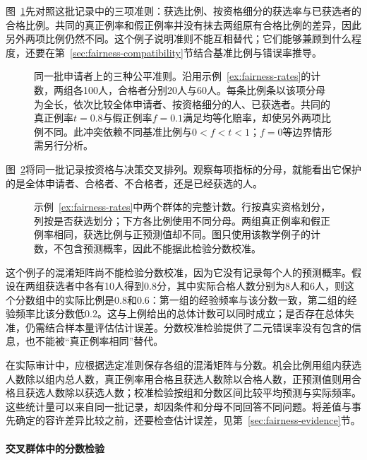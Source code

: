 图~\ref{fig:trust-fairness-incompatibility}先对照这批记录中的三项准则：获选比例、按资格细分的获选率与已获选者的合格比例。共同的真正例率和假正例率并没有抹去两组原有合格比例的差异，因此另外两项比例仍然不同。这个例子说明准则不能互相替代；它们能够兼顾到什么程度，还要在第~\ref{sec:fairness-compatibility}节结合基准比例与错误率推导。

\begin{figure}[htbp]
  \centering
  
  \caption{同一批申请者上的三种公平准则。沿用示例~\ref{ex:fairness-rates}的计数，两组各100人，合格者分别20人与60人。每条比例条以该项分母为全长，依次比较全体申请者、按资格细分的人、已获选者。共同的真正例率$t=0.8$与假正例率$f=0.1$满足均等化赔率，却使另外两项比例不同。此冲突依赖不同基准比例与$0<f<t<1$；$f=0$等边界情形需另行分析。}
  \label{fig:trust-fairness-incompatibility}
\end{figure}

图~\ref{fig:trust-fairness-denominators}将同一批记录按资格与决策交叉排列。观察每项指标的分母，就能看出它保护的是全体申请者、合格者、不合格者，还是已经获选的人。

\begin{figure}[!htb]
  \centering
  
  \caption{示例~\ref{ex:fairness-rates}中两个群体的完整计数。行按真实资格划分，列按是否获选划分；下方各比例使用不同分母。两组真正例率和假正例率相同，获选比例与正预测值却不同。图只使用该教学例子的计数，不包含预测概率，因此不能据此检验分数校准。}
  \label{fig:trust-fairness-denominators}
\end{figure}

这个例子的混淆矩阵尚不能检验分数校准，因为它没有记录每个人的预测概率。假设在两组获选者中各有10人得到$0.8$分，其中实际合格人数分别为8人和6人，则这个分数组中的实际比例是$0.8$和$0.6$：第一组的经验频率与该分数一致，第二组的经验频率比该分数低$0.2$。这与上例给出的总体计数可以同时成立；是否存在总体失准，仍需结合样本量评估估计误差。分数校准检验提供了二元错误率没有包含的信息，也不能被“真正例率相同”替代。

在实际审计中，应根据选定准则保存各组的混淆矩阵与分数。机会比例用组内获选人数除以组内总人数，真正例率用合格且获选人数除以合格人数，正预测值则用合格且获选人数除以获选人数；校准检验按组和分数区间比较平均预测与实际频率。这些统计量可以来自同一批记录，却因条件和分母不同回答不同问题。将差值与事先确定的容许差异比较之前，还要检查估计误差，见第~\ref{sec:fairness-evidence}节。

\paragraph{交叉群体中的分数检验}

